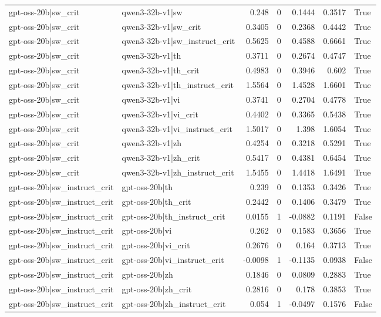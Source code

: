 \begin{table}
\begin{tabular}{l l r r r r l}
gpt-oss-20b|sw_crit & qwen3-32b-v1|sw & 0.248 & 0 & 0.1444 & 0.3517 & True \\
gpt-oss-20b|sw_crit & qwen3-32b-v1|sw_crit & 0.3405 & 0 & 0.2368 & 0.4442 & True \\
gpt-oss-20b|sw_crit & qwen3-32b-v1|sw_instruct_crit & 0.5625 & 0 & 0.4588 & 0.6661 & True \\
gpt-oss-20b|sw_crit & qwen3-32b-v1|th & 0.3711 & 0 & 0.2674 & 0.4747 & True \\
gpt-oss-20b|sw_crit & qwen3-32b-v1|th_crit & 0.4983 & 0 & 0.3946 & 0.602 & True \\
gpt-oss-20b|sw_crit & qwen3-32b-v1|th_instruct_crit & 1.5564 & 0 & 1.4528 & 1.6601 & True \\
gpt-oss-20b|sw_crit & qwen3-32b-v1|vi & 0.3741 & 0 & 0.2704 & 0.4778 & True \\
gpt-oss-20b|sw_crit & qwen3-32b-v1|vi_crit & 0.4402 & 0 & 0.3365 & 0.5438 & True \\
gpt-oss-20b|sw_crit & qwen3-32b-v1|vi_instruct_crit & 1.5017 & 0 & 1.398 & 1.6054 & True \\
gpt-oss-20b|sw_crit & qwen3-32b-v1|zh & 0.4254 & 0 & 0.3218 & 0.5291 & True \\
gpt-oss-20b|sw_crit & qwen3-32b-v1|zh_crit & 0.5417 & 0 & 0.4381 & 0.6454 & True \\
gpt-oss-20b|sw_crit & qwen3-32b-v1|zh_instruct_crit & 1.5455 & 0 & 1.4418 & 1.6491 & True \\
gpt-oss-20b|sw_instruct_crit & gpt-oss-20b|th & 0.239 & 0 & 0.1353 & 0.3426 & True \\
gpt-oss-20b|sw_instruct_crit & gpt-oss-20b|th_crit & 0.2442 & 0 & 0.1406 & 0.3479 & True \\
gpt-oss-20b|sw_instruct_crit & gpt-oss-20b|th_instruct_crit & 0.0155 & 1 & -0.0882 & 0.1191 & False \\
gpt-oss-20b|sw_instruct_crit & gpt-oss-20b|vi & 0.262 & 0 & 0.1583 & 0.3656 & True \\
gpt-oss-20b|sw_instruct_crit & gpt-oss-20b|vi_crit & 0.2676 & 0 & 0.164 & 0.3713 & True \\
gpt-oss-20b|sw_instruct_crit & gpt-oss-20b|vi_instruct_crit & -0.0098 & 1 & -0.1135 & 0.0938 & False \\
gpt-oss-20b|sw_instruct_crit & gpt-oss-20b|zh & 0.1846 & 0 & 0.0809 & 0.2883 & True \\
gpt-oss-20b|sw_instruct_crit & gpt-oss-20b|zh_crit & 0.2816 & 0 & 0.178 & 0.3853 & True \\
gpt-oss-20b|sw_instruct_crit & gpt-oss-20b|zh_instruct_crit & 0.054 & 1 & -0.0497 & 0.1576 & False \\

\end{tabular}
\end{table}
